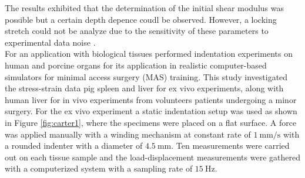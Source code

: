 The results exhibited that the determination of the initial shear modulus was possible but a 
certain depth depence coudl be observed. However, a locking stretch could not be analyze due to the 
sensitivity of these parameters to experimental data noise \cite{Zhang2014}.\\

For an application with biological tissues \citet{Carter2001} performed indentation experiments on 
human and porcine organs for its application in realistic computer-based simulators 
for minimal access surgery (MAS) training. 
This study investigated the stress-strain data pig spleen and liver for ex vivo experiments, 
along with human liver for in vivo experiments from volunteers patients undergoing a minor 
surgery. For the ex vivo experiment a static indentation setup was used as shown in Figure 
\ref{fig:carter1}, where the specimens were placed on a flat surface. A force was applied 
manually with a winding mechanism at constant rate of $\SI[per-mode = symbol]{1}{\milli \m\per \second}$ 
with a rounded indenter with a diameter of $\SI{4.5}{\milli \m}$. Ten measurements were 
carried out on each tissue sample and the load-displacement measurements were 
gathered with a computerized system with a sampling rate of $\SI{15}{\hertz}$.\\

